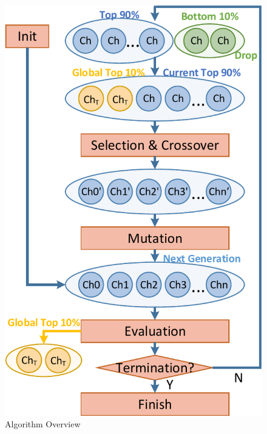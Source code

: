 \subsection{\garand}


\begingroup
\setlength{\columnsep}{8pt}%
	
\begin{figure}
	\begin{center}
		\includegraphics[width=\linewidth]{fig/pGA.pdf}
	\end{center}
	\vspace{-5pt}
	\caption{Algorithm Overview}
	\label{fig:GA}
\end{figure}

